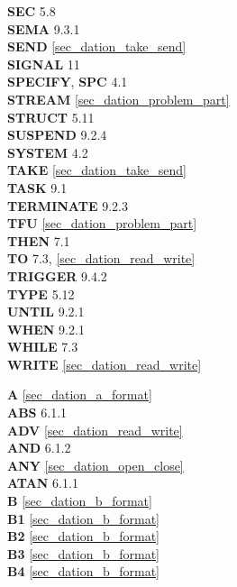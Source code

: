 {{{\bf SEC} 5.8\\
{\bf SEMA} 9.3.1\\
{\bf SEND} \ref{sec_dation_take_send}\\
{\bf SIGNAL} 11\\
{\bf SPECIFY}, {\bf SPC} 4.1\\
{\bf STREAM} \ref{sec_dation_problem_part}\\
{\bf STRUCT} 5.11\\
{\bf SUSPEND} 9.2.4\\
{\bf SYSTEM} 4.2\\
 
{\bf TAKE} \ref{sec_dation_take_send}\\
{\bf TASK} 9.1\\
{\bf TERMINATE} 9.2.3\\
{\bf TFU} \ref{sec_dation_problem_part}\\
{\bf THEN} 7.1\\
{\bf TO} 7.3, \ref{sec_dation_read_write}\\
{\bf TRIGGER} 9.4.2\\
{\bf TYPE} 5.12\\
 
{\bf UNTIL} 9.2.1\\
 
{\bf WHEN} 9.2.1\\
{\bf WHILE} 7.3\\
{\bf WRITE} \ref{sec_dation_read_write}\\
}
\onecolumn


{
{\bf A} \ref{sec_dation_a_format}\\
{\bf ABS} 6.1.1\\
{\bf ADV} \ref{sec_dation_read_write}\\
{\bf AND} 6.1.2\\
{\bf ANY} \ref{sec_dation_open_close}\\
{\bf ATAN} 6.1.1\\

{\bf B} \ref{sec_dation_b_format}\\
{\bf B1} \ref{sec_dation_b_format}\\
{\bf B2} \ref{sec_dation_b_format}\\
{\bf B3} \ref{sec_dation_b_format}\\
{\bf B4} \ref{sec_dation_b_format}\\

}}
